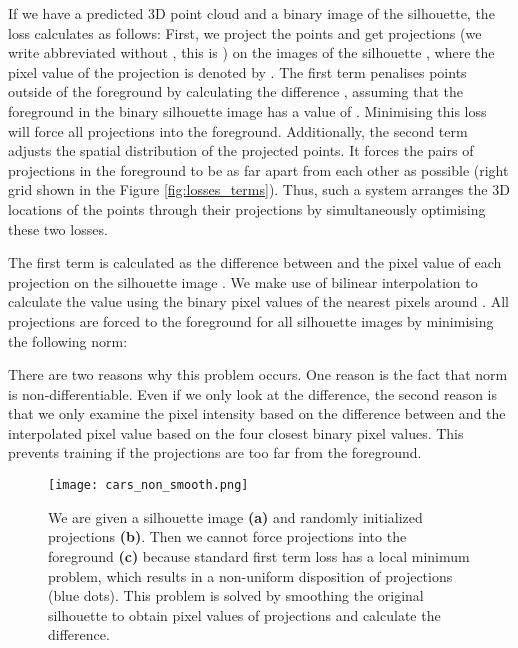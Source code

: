 \documentclass[runningheads]{llncs}
\begin{document}
If we have a predicted 3D point cloud and a binary image of the silhouette, the loss calculates as follows: First, we project the points  and get projections  (we write abbreviated without , this is ) on the images of the silhouette , where the pixel value of the projection  is denoted by . The first term penalises points outside of the foreground by calculating the difference , assuming that the foreground in the binary silhouette image has a value of . Minimising this loss will force all projections into the foreground. Additionally, the second term adjusts the spatial distribution of the projected points. It forces the pairs of projections in the foreground to be as far apart from each other as possible (right grid shown in the Figure \ref{fig:losses_terms}). Thus, such a system arranges the 3D locations of the points  through their projections  by simultaneously optimising these two losses.

The first term is calculated as the difference between  and the pixel value  of each projection  on the silhouette image . We make use of bilinear interpolation to calculate the value  using the binary pixel values of the nearest pixels around . All projections are forced to the foreground for all silhouette images by minimising the following  norm:



There are two reasons why this problem occurs. One reason is the fact that  norm is non-differentiable. Even if we only look at the difference, the second reason is that we only examine the pixel intensity based on the difference between  and the interpolated pixel value  based on the four closest binary pixel values. This prevents training if the projections  are too far from the foreground.

\begin{figure*}[h]
\centering
\setlength{\abovecaptionskip}{3pt}

 \texttt{[image: cars\_non\_smooth.png]}
 \caption{We are given a silhouette image \textbf{(a)} and randomly initialized projections \textbf{(b)}. Then we cannot force projections into the foreground \textbf{(c)} because standard first term loss has a local minimum problem, which results in a non-uniform disposition of projections (blue dots). This problem is solved by smoothing the original silhouette to obtain pixel values of projections and calculate the difference.} 
\label{fig:cars_non_smooth}
\end{figure*}
\end{document}

